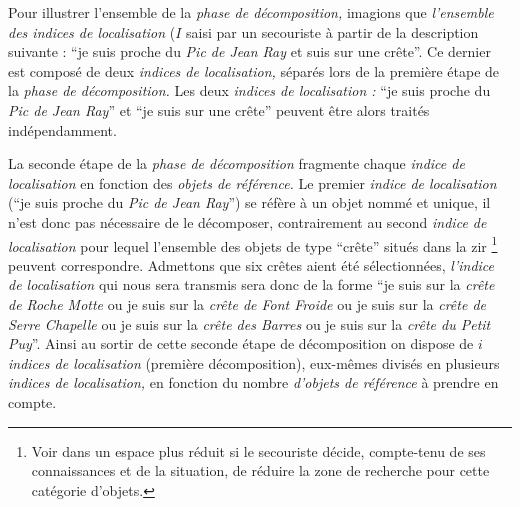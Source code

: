 Pour illustrer l'ensemble de la \emph{phase de décomposition,}
imagions que \emph{l'ensemble des indices de localisation} (\(I\)
saisi par un secouriste à partir de la description suivante :
\enquote{je suis proche du \emph{Pic de Jean Ray} et suis sur une
  crête}. Ce dernier est composé de deux \emph{indices de
  localisation,} séparés lors de la première étape de la \emph{phase
  de décomposition.} Les deux \emph{indices de localisation :}
\enquote{je suis proche du \emph{Pic de Jean Ray}} et \enquote{je suis
  sur une crête} peuvent être alors traités indépendamment.

\begin{quote}
\end{quote}


La seconde étape de la \emph{phase de décomposition} fragmente chaque
\emph{indice de localisation} en fonction des \emph{objets de
  référence.} Le premier \emph{indice de localisation} (\enquote{je
  suis proche du \emph{Pic de Jean Ray}}) se réfère à un objet nommé
et unique, il n'est donc pas nécessaire de le décomposer,
contrairement au second \emph{indice de localisation} pour lequel
l'ensemble des objets de type \enquote{crête} situés dans la \ac{zir}
\footnote{Voir dans un espace plus réduit si le secouriste décide,
  compte-tenu de ses connaissances et de la situation, de réduire la
  zone de recherche pour cette catégorie d'objets.} peuvent
correspondre. Admettons que six crêtes aient été sélectionnées,
\emph{l'indice de localisation} qui nous sera transmis sera donc de la
forme \enquote{je suis sur la \emph{crête de Roche Motte} ou je suis
  sur la \emph{crête de Font Froide} ou je suis sur la \emph{crête de
    Serre Chapelle} ou je suis sur la \emph{crête des Barres} ou je
  suis sur la \emph{crête du Petit Puy}}. Ainsi au sortir de cette
seconde étape de décomposition on dispose de \(i\) \emph{indices de
  localisation} (première décomposition), eux-mêmes divisés en
plusieurs \emph{indices de localisation,} en fonction du nombre
\emph{d'objets de référence} à prendre en compte.

